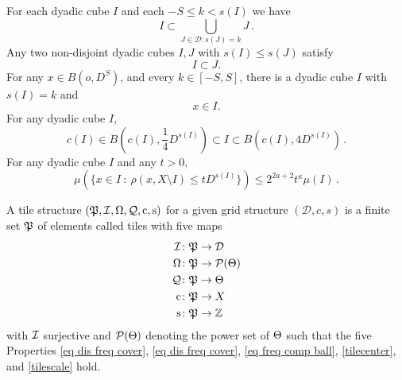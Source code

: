For each dyadic cube $I$  and each $-S\le k<s(I)$ we have
\begin{equation}\label{coverdyadic}
I\subset \bigcup_{J\in \mathcal {D}: s(J)=k}J\, .
\end{equation}
Any two non-disjoint dyadic cubes  $I,J$ with $s(I)\le s(J)$ satisfy
\begin{equation}\label{dyadicproperty}
I\subset J.
\end{equation}
For any $x\in B(o,D^S)$, and every $k\in[-S,S]$, there
is a dyadic cube $I$ with $s(I)=k$ and
\begin{equation}\label{coverball}
x\in I.
\end{equation}
For any dyadic cube $I$,
 \begin{equation}
        \label{eq vol sp cube}
        c(I)\in B(c(I), \frac{1}{4} D^{s(I)}) \subset I \subset B(c(I), 4 D^{s(I)})\,.
    \end{equation}
For any dyadic cube  $I$ and any $t>0$,
\begin{equation}
        \label{eq small boundary}
        \mu(\{x \in I \ : \ \rho(x, X \setminus I) \leq t D^{s(I)}\}) \le 2^{2a+2} t^\kappa \mu(I)\,.
    \end{equation}








A tile structure  $(\fP,\sc,\fc,\fcc,\pc,\ps)$
for a given grid structure $(\mathcal{D}, c, s)$
is a finite set $\fP$  of elements called tiles with five maps
\begin{align*}
\sc&\colon \fP\to {\mathcal{D}}\\
\fc&\colon \fP\to \mathcal{P}(\Mf) \\
\fcc &\colon \fP\to \Mf\\
\pc &\colon \fP\to X\\
\ps &\colon \fP\to \mathbb{Z}
\end{align*}
with $\sc$ surjective and $\mathcal{P}(\Mf)$ denoting the power set of $\Mf$ such that the five Properties \eqref{eq dis freq cover}, \eqref{eq dis freq cover},
\eqref{eq freq comp ball}, \ref{tilecenter}, and
\ref{tilescale} hold.


